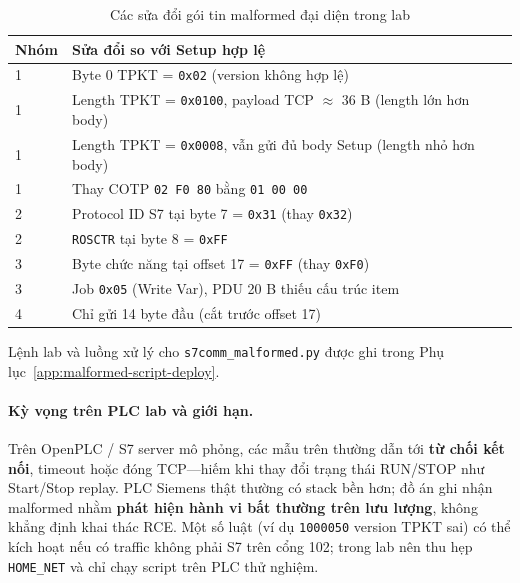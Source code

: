 \documentclass[../main.tex]{subfiles}
\begin{document}
\begin{table}[H]
    \centering
    \footnotesize
    \begin{tabular}{|l|l|}
        \hline
        \textbf{Nhóm} & \textbf{Sửa đổi so với Setup hợp lệ} \\
        \hline
        1 & Byte 0 TPKT = \texttt{0x02} (version không hợp lệ) \\
        \hline
        1 & Length TPKT = \texttt{0x0100}, payload TCP $\approx$ 36 B (length lớn hơn body) \\
        \hline
        1 & Length TPKT = \texttt{0x0008}, vẫn gửi đủ body Setup (length nhỏ hơn body) \\
        \hline
        1 & Thay COTP \texttt{02 F0 80} bằng \texttt{01 00 00} \\
        \hline
        2 & Protocol ID S7 tại byte 7 = \texttt{0x31} (thay \texttt{0x32}) \\
        \hline
        2 & \texttt{ROSCTR} tại byte 8 = \texttt{0xFF} \\
        \hline
        3 & Byte chức năng tại offset 17 = \texttt{0xFF} (thay \texttt{0xF0}) \\
        \hline
        3 & Job \texttt{0x05} (Write Var), PDU 20 B thiếu cấu trúc item \\
        \hline
        4 & Chỉ gửi 14 byte đầu (cắt trước offset 17) \\
        \hline
    \end{tabular}
    \caption{Các sửa đổi gói tin malformed đại diện trong lab}
    \label{tab:malformed-changes}
\end{table}

Lệnh lab và luồng xử lý cho \texttt{s7comm\_malformed.py} được ghi trong Phụ lục~\ref{app:malformed-script-deploy}.

\paragraph{Kỳ vọng trên PLC lab và giới hạn.}

Trên OpenPLC / S7 server mô phỏng, các mẫu trên thường dẫn tới \textbf{từ chối kết nối}, timeout hoặc đóng TCP---hiếm khi thay đổi trạng thái RUN/STOP như Start/Stop replay. PLC Siemens thật thường có stack bền hơn; đồ án ghi nhận malformed nhằm \textbf{phát hiện hành vi bất thường trên lưu lượng}, không khẳng định khai thác RCE. Một số luật (ví dụ \texttt{1000050} version TPKT sai) có thể kích hoạt nếu có traffic không phải S7 trên cổng 102; trong lab nên thu hẹp \texttt{HOME\_NET} và chỉ chạy script trên PLC thử nghiệm.
\end{document}
